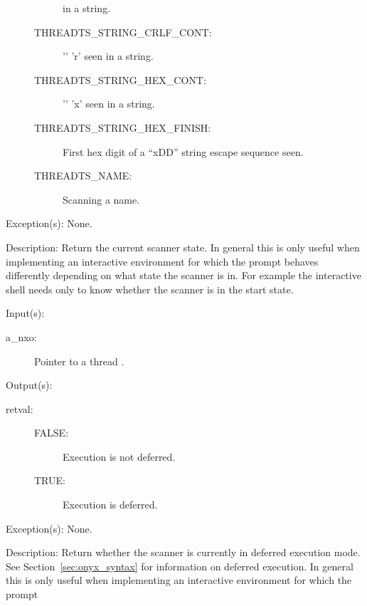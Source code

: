 \begin{capi}
\begin{capilist}
\begin{description}
\begin{description}
				in a string.
			\item[THREADTS\_STRING\_CRLF\_CONT: ] '{\bs}' '{\bs}r'
				seen in a string.
			\item[THREADTS\_STRING\_HEX\_CONT: ] '{\bs}' 'x' seen in
				a string.
			\item[THREADTS\_STRING\_HEX\_FINISH: ] First hex digit
				of a ``{\bs}xDD'' string escape sequence seen.
			\item[THREADTS\_NAME: ] Scanning a name.
			\end{description}
		\end{description}
	\item[Exception(s): ] None.
	\item[Description: ]
		Return the current scanner state.  In general this is only
		useful when implementing an interactive environment for which
		the prompt behaves differently depending on what state the
		scanner is in.  For example the interactive  shell
		needs only to know whether the scanner is in the start state.
	\end{capilist}
\label{nxo_thread_deferred}
	\begin{capilist}
	\item[Input(s): ]
		\begin{description}\item[]
		\item[a\_nxo: ]
			Pointer to a thread .
		\end{description}
	\item[Output(s): ]
		\begin{description}\item[]
		\item[retval: ]
			\begin{description}\item[]
			\item[FALSE: ]
				Execution is not deferred.
			\item[TRUE: ]
				Execution is deferred.
			\end{description}
		\end{description}
	\item[Exception(s): ] None.
	\item[Description: ]
		Return whether the scanner is currently in deferred execution
		mode.  See Section~\ref{sec:onyx_syntax} for information on
		deferred execution.  In general this is only useful when
		implementing an interactive environment for which the prompt

\end{capilist}
\end{capi}
